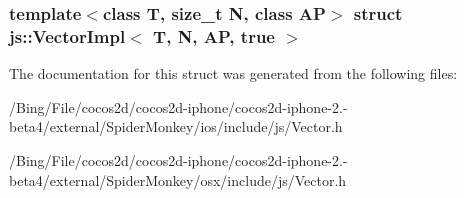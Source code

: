 \subsubsection*{template$<$class T, size\-\_\-t N, class A\-P$>$ struct js\-::\-Vector\-Impl$<$ T, N, A\-P, true $>$}



The documentation for this struct was generated from the following files\-:\begin{DoxyCompactItemize}
\item 
/\-Bing/\-File/cocos2d/cocos2d-\/iphone/cocos2d-\/iphone-\/2.-\/beta4/external/\-Spider\-Monkey/ios/include/js/Vector.\-h\item 
/\-Bing/\-File/cocos2d/cocos2d-\/iphone/cocos2d-\/iphone-\/2.-\/beta4/external/\-Spider\-Monkey/osx/include/js/Vector.\-h\end{DoxyCompactItemize}
